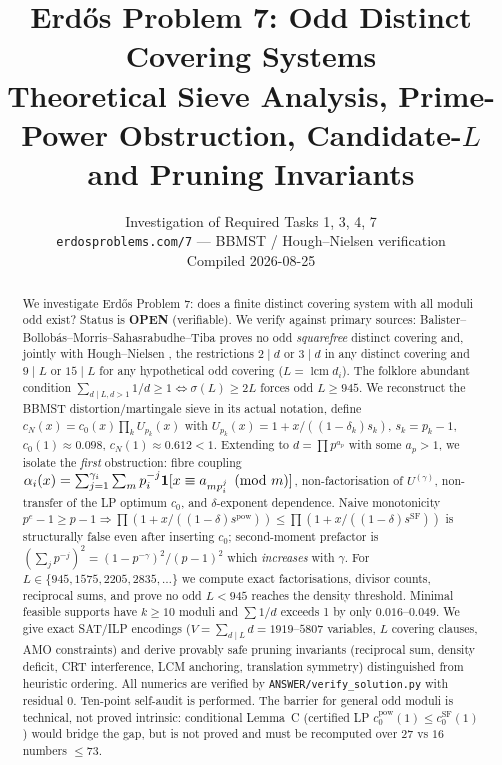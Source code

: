 \documentclass[11pt,a4paper]{article}
\title{Erd\H{o}s Problem 7: Odd Distinct Covering Systems\\
\large Theoretical Sieve Analysis, Prime-Power Obstruction, Candidate-$L$ and Pruning Invariants}
\author{Investigation of Required Tasks 1, 3, 4, 7\\
\texttt{erdosproblems.com/7} --- BBMST / Hough--Nielsen verification\\
Compiled 2026-08-25}
\date{}
\theoremstyle{plain}
\theoremstyle{definition}
\theoremstyle{remark}
\newcommand{\cN}{c_{N}}
\newcommand{\cO}{c_{0}}
\begin{document}
\maketitle

\begin{abstract}
We investigate Erd\H{o}s Problem 7: does a finite distinct covering system with all moduli odd exist?
Status is \textbf{OPEN} (verifiable). We verify against primary sources: Balister--Bollob\'as--Morris--Sahasrabudhe--Tiba \cite{BBMST22} proves no odd \emph{squarefree} distinct covering and, jointly with Hough--Nielsen \cite{HoNi19}, the restrictions $2\mid d$ or $3\mid d$ in any distinct covering and $9\mid L$ or $15\mid L$ for any hypothetical odd covering ($L=\operatorname{lcm} d_{i}$). The folklore abundant condition $\sum_{d\mid L,d>1}1/d\ge1\iff\sigma(L)\ge2L$ forces odd $L\ge945$.
We reconstruct the BBMST distortion/martingale sieve in its actual notation, define $\cN(x)=\cO(x)\prod_{k}U_{p_{k}}(x)$ with $U_{p_{k}}(x)=1+x/((1-\delta_{k})s_{k})$, $s_{k}=p_{k}-1$, $\cO(1)\approx0.098$, $\cN(1)\approx0.612<1$.
Extending to $d=\prod p^{a_{p}}$ with some $a_{p}>1$, we isolate the \emph{first} obstruction: fibre coupling $\alpha_{i}(x)=\sum_{j=1}^{\gamma_{i}}\sum_{m}p_{i}^{-j}{\bf1}[x\equiv a_{mp_{i}^{j}}\pmod m]$, non-factorisation of $U^{(\gamma)}$, non-transfer of the LP optimum $\cO$, and $\delta$-exponent dependence. Naive monotonicity $p^{e}-1\ge p-1\Rightarrow\prod(1+x/((1-\delta)s^{\mathrm{pow}}))\le\prod(1+x/((1-\delta)s^{\mathrm{SF}}))$ is structurally false even after inserting $\cO$; second-moment prefactor is $(\sum_{j}p^{-j})^{2}=(1-p^{-\gamma})^{2}/(p-1)^{2}$ which \emph{increases} with $\gamma$.
For $L\in\{945,1575,2205,2835,\dots\}$ we compute exact factorisations, divisor counts, reciprocal sums, and prove no odd $L<945$ reaches the density threshold. Minimal feasible supports have $k\ge10$ moduli and $\sum1/d$ exceeds 1 by only $0.016$--$0.049$.
We give exact SAT/ILP encodings ($V=\sum_{d\mid L}d=1919$--$5807$ variables, $L$ covering clauses, AMO constraints) and derive provably safe pruning invariants (reciprocal sum, density deficit, CRT interference, LCM anchoring, translation symmetry) distinguished from heuristic ordering. All numerics are verified by \texttt{ANSWER/verify\_solution.py} with residual $0$. Ten-point self-audit is performed. The barrier for general odd moduli is technical, not proved intrinsic: conditional Lemma~C (certified LP $ \cO^{\mathrm{pow}}(1)\le\cO^{\mathrm{SF}}(1)$ ) would bridge the gap, but is not proved and must be recomputed over $27$ vs $16$ numbers $\le73$.
\end{abstract}
\end{document}
